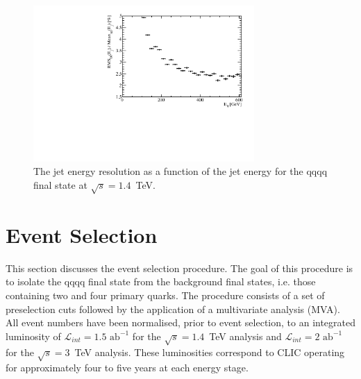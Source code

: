 \begin{figure}
\centering
\includegraphics[width=0.75\textwidth]{PhysicsAnalysis/Plots/JetEnergyResolution/JetEnergyResolutionScan_1400GeV.pdf}
\caption[The jet energy resolution as a function of the jet energy for the {\nu}{\nu}qqqq final state at $\sqrt{s}=1.4$~TeV.]{The jet energy resolution as a function of the jet energy for the {\nu}{\nu}qqqq final state at $\sqrt{s}=1.4$~TeV.}
\label{fig:jeteenrgyresolutionphysicsanalysis}
\end{figure}


\section{Event Selection}
\label{sec:eventselection}
This section discusses the event selection procedure.  The goal of this procedure is to isolate the \nu{\nu}qqqq final state from the background final states, i.e. those containing two and four primary quarks.  The procedure consists of a set of preselection cuts followed by the application of a multivariate analysis (MVA).  All event numbers  have been normalised, prior to event selection, to an integrated luminosity of $\mathcal{L}_{int} = 1.5\text{ ab}^{-1}$ for the $\sqrt{s} = 1.4$~TeV analysis and $\mathcal{L}_{int} = 2\text{ ab}^{-1}$  for the $\sqrt{s} = 3$~TeV analysis.  {These luminosities correspond to CLIC operating for approximately four to five years at each energy stage.}


